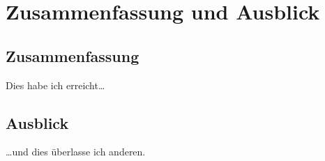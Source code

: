 


\chapter{Zusammenfassung und Ausblick}
\label{chap:conclusions}


\section*{Zusammenfassung}

Dies habe ich erreicht\ldots



\section*{Ausblick}

\ldots und dies überlasse ich anderen.

